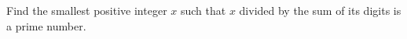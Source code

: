 Find the smallest positive integer $x$ such that $x$ divided by the sum of its digits is a prime number.
